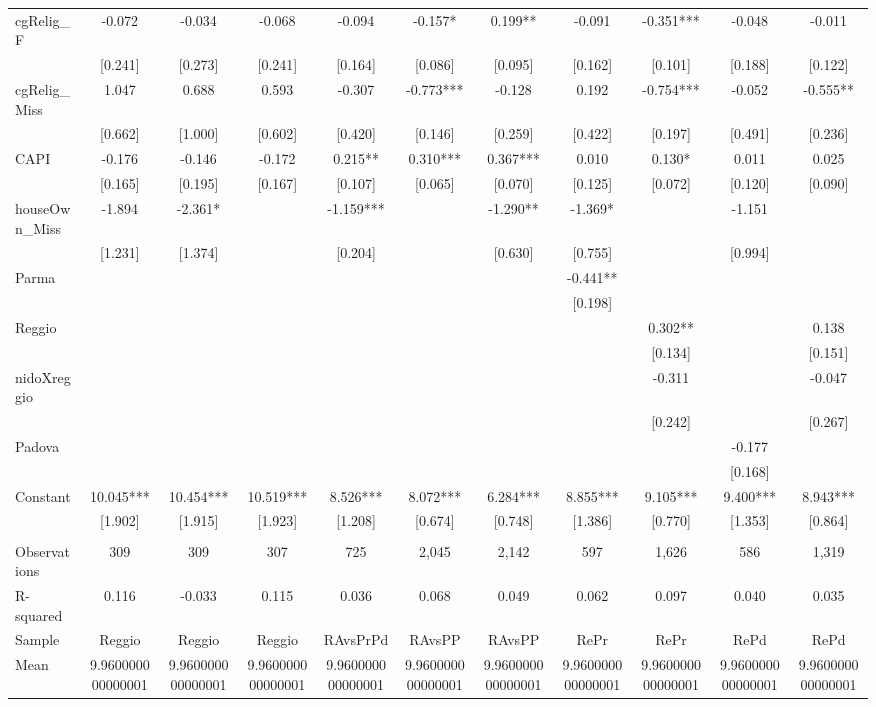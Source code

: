 \documentclass[]{article}
\begin{document}
\begin{tabular}{lcccccccccc}
cgRelig\_F & -0.072 & -0.034 & -0.068 & -0.094 & -0.157* & 0.199** & -0.091 & -0.351*** & -0.048 & -0.011 \\
 & [0.241] & [0.273] & [0.241] & [0.164] & [0.086] & [0.095] & [0.162] & [0.101] & [0.188] & [0.122] \\
cgRelig\_Miss & 1.047 & 0.688 & 0.593 & -0.307 & -0.773*** & -0.128 & 0.192 & -0.754*** & -0.052 & -0.555** \\
 & [0.662] & [1.000] & [0.602] & [0.420] & [0.146] & [0.259] & [0.422] & [0.197] & [0.491] & [0.236] \\
CAPI & -0.176 & -0.146 & -0.172 & 0.215** & 0.310*** & 0.367*** & 0.010 & 0.130* & 0.011 & 0.025 \\
 & [0.165] & [0.195] & [0.167] & [0.107] & [0.065] & [0.070] & [0.125] & [0.072] & [0.120] & [0.090] \\
houseOwn\_Miss & -1.894 & -2.361* &  & -1.159*** &  & -1.290** & -1.369* &  & -1.151 &  \\
 & [1.231] & [1.374] &  & [0.204] &  & [0.630] & [0.755] &  & [0.994] &  \\
Parma &  &  &  &  &  &  & -0.441** &  &  &  \\
 &  &  &  &  &  &  & [0.198] &  &  &  \\
Reggio &  &  &  &  &  &  &  & 0.302** &  & 0.138 \\
 &  &  &  &  &  &  &  & [0.134] &  & [0.151] \\
nidoXreggio &  &  &  &  &  &  &  & -0.311 &  & -0.047 \\
 &  &  &  &  &  &  &  & [0.242] &  & [0.267] \\
Padova &  &  &  &  &  &  &  &  & -0.177 &  \\
 &  &  &  &  &  &  &  &  & [0.168] &  \\
Constant & 10.045*** & 10.454*** & 10.519*** & 8.526*** & 8.072*** & 6.284*** & 8.855*** & 9.105*** & 9.400*** & 8.943*** \\
 & [1.902] & [1.915] & [1.923] & [1.208] & [0.674] & [0.748] & [1.386] & [0.770] & [1.353] & [0.864] \\
 &  &  &  &  &  &  &  &  &  &  \\
Observations & 309 & 309 & 307 & 725 & 2,045 & 2,142 & 597 & 1,626 & 586 & 1,319 \\
R-squared & 0.116 & -0.033 & 0.115 & 0.036 & 0.068 & 0.049 & 0.062 & 0.097 & 0.040 & 0.035 \\
Sample & Reggio & Reggio & Reggio & RAvsPrPd & RAvsPP & RAvsPP & RePr & RePr & RePd & RePd \\
 Mean & 9.960000000000001 & 9.960000000000001 & 9.960000000000001 & 9.960000000000001 & 9.960000000000001 & 9.960000000000001 & 9.960000000000001 & 9.960000000000001 & 9.960000000000001 & 9.960000000000001 \\ \hline

\end{tabular}
\end{document}
